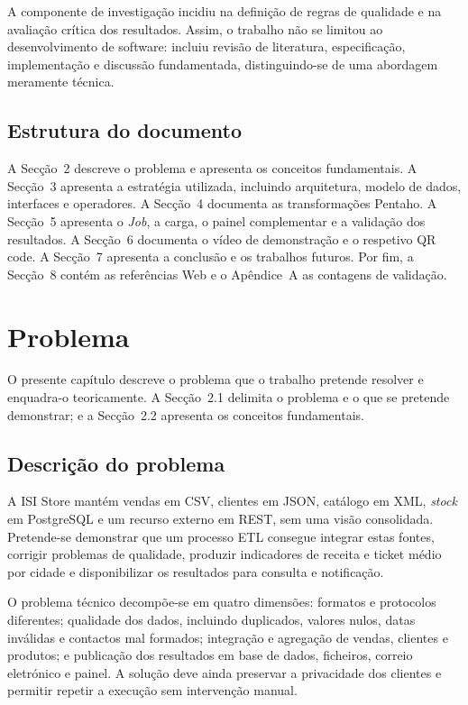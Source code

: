 \documentclass[11pt,a4paper]{article}
\begin{document}
A componente de investigação incidiu na definição de regras de qualidade e na avaliação crítica dos resultados. Assim, o trabalho não se limitou ao desenvolvimento de software: incluiu revisão de literatura, especificação, implementação e discussão fundamentada, distinguindo-se de uma abordagem meramente técnica.

\subsection{Estrutura do documento}
A Secção~2 descreve o problema e apresenta os conceitos fundamentais. A Secção~3 apresenta a estratégia utilizada, incluindo arquitetura, modelo de dados, interfaces e operadores. A Secção~4 documenta as transformações Pentaho. A Secção~5 apresenta o \textit{Job}, a carga, o painel complementar e a validação dos resultados. A Secção~6 documenta o vídeo de demonstração e o respetivo QR code. A Secção~7 apresenta a conclusão e os trabalhos futuros. Por fim, a Secção~8 contém as referências Web e o Apêndice~A as contagens de validação.

\section{Problema}
O presente capítulo descreve o problema que o trabalho pretende resolver e enquadra-o teoricamente. A Secção~2.1 delimita o problema e o que se pretende demonstrar; e a Secção~2.2 apresenta os conceitos fundamentais.

\subsection{Descrição do problema}
A ISI Store mantém vendas em CSV, clientes em JSON, catálogo em XML, \textit{stock} em PostgreSQL e um recurso externo em REST, sem uma visão consolidada. Pretende-se demonstrar que um processo ETL consegue integrar estas fontes, corrigir problemas de qualidade, produzir indicadores de receita e ticket médio por cidade e disponibilizar os resultados para consulta e notificação.

O problema técnico decompõe-se em quatro dimensões: formatos e protocolos diferentes; qualidade dos dados, incluindo duplicados, valores nulos, datas inválidas e contactos mal formados; integração e agregação de vendas, clientes e produtos; e publicação dos resultados em base de dados, ficheiros, correio eletrónico e painel. A solução deve ainda preservar a privacidade dos clientes e permitir repetir a execução sem intervenção manual.
\end{document}
